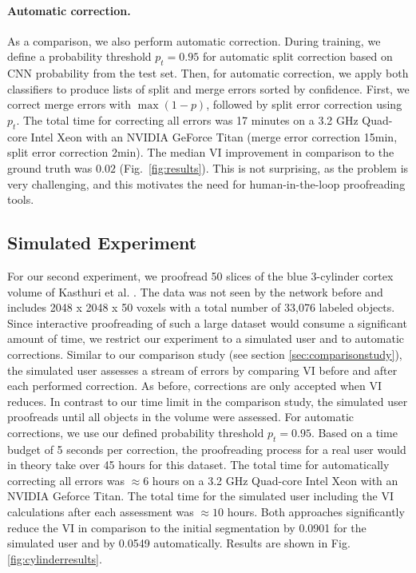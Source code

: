 \paragraph{Automatic correction.} As a comparison, we also perform automatic correction. During training, we define a probability threshold $p_t=0.95$ for automatic split correction based on CNN probability from the test set. Then, for automatic correction, we apply both classifiers to produce lists of split and merge errors sorted by confidence. First, we correct merge errors with $\max(1-p)$, followed by split error correction using $p_t$. The total time for correcting all errors was 17 minutes on a 3.2 GHz Quad-core Intel Xeon with an NVIDIA GeForce Titan (merge error correction 15min, split error correction 2min). The median VI improvement in comparison to the ground truth was $0.02$ (Fig.~\ref{fig:results}). This is not surprising, as the problem is very challenging, and this motivates the need for human-in-the-loop proofreading tools.

\subsection{Simulated Experiment}

For our second experiment, we proofread 50 slices of the blue 3-cylinder cortex volume of Kasthuri et al. \cite{kasthuri2015saturated}. The data was not seen by the network before and includes 2048 x 2048 x 50 voxels with a total number of 33,076 labeled objects. Since interactive proofreading of such a large dataset would consume a significant amount of time, we restrict our experiment to a simulated user and to automatic corrections. Similar to our comparison study (see section \ref{sec:comparisonstudy}), the simulated user assesses a stream of errors by comparing VI before and after each performed correction. As before, corrections are only accepted when VI reduces. In contrast to our time limit in the comparison study, the simulated user proofreads until all objects in the volume were assessed. For automatic corrections, we use our defined probability threshold $p_t=0.95$. 
Based on a time budget of 5 seconds per correction, the proofreading process for a real user would in theory take over 45 hours for this dataset. The total time for automatically correcting all errors was $\approx6$ hours on a 3.2 GHz Quad-core Intel Xeon with an NVIDIA Geforce Titan. The total time for the simulated user including the VI calculations after each assessment was $\approx10$ hours. Both approaches significantly reduce the VI in comparison to the initial segmentation by 0.0901 for the simulated user and by 0.0549 automatically. Results are shown in Fig. \ref{fig:cylinderresults}. 